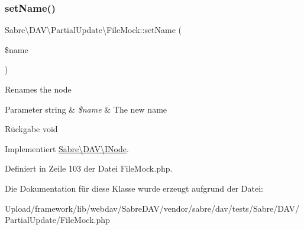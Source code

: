 \subsubsection{\texorpdfstring{set\+Name()}{setName()}}
{\footnotesize\ttfamily Sabre\textbackslash{}\+D\+A\+V\textbackslash{}\+Partial\+Update\textbackslash{}\+File\+Mock\+::set\+Name (\begin{DoxyParamCaption}\item[{}]{\$name }\end{DoxyParamCaption})}

Renames the node


\begin{DoxyParams}[1]{Parameter}
string & {\em \$name} & The new name \\
\hline
\end{DoxyParams}
\begin{DoxyReturn}{Rückgabe}
void 
\end{DoxyReturn}


Implementiert \mbox{\hyperlink{interface_sabre_1_1_d_a_v_1_1_i_node_ac90fa5526e98def2e1f51bc57a772366}{Sabre\textbackslash{}\+D\+A\+V\textbackslash{}\+I\+Node}}.



Definiert in Zeile 103 der Datei File\+Mock.\+php.



Die Dokumentation für diese Klasse wurde erzeugt aufgrund der Datei\+:\begin{DoxyCompactItemize}
\item 
Upload/framework/lib/webdav/\+Sabre\+D\+A\+V/vendor/sabre/dav/tests/\+Sabre/\+D\+A\+V/\+Partial\+Update/File\+Mock.\+php\end{DoxyCompactItemize}
